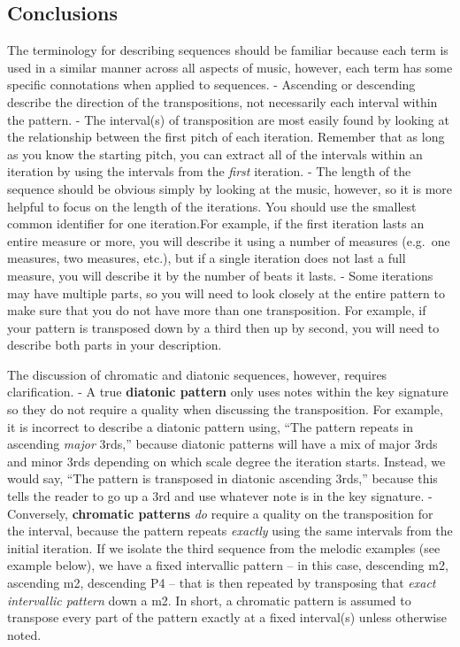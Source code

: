 \documentclass{book}
\begin{document}
\hypertarget{conclusions-20}{%
\subsection{Conclusions}\label{conclusions-20}}

The terminology for describing sequences should be familiar because each term
is used in a similar manner across all aspects of music, however, each term
has some specific connotations when applied to sequences. - Ascending or
descending describe the direction of the transpositions, not necessarily each
interval within the pattern. - The interval(s) of transposition are most
easily found by looking at the relationship between the first pitch of each
iteration. Remember that as long as you know the starting pitch, you can
extract all of the intervals within an iteration by using the intervals from
the \emph{first} iteration. - The length of the sequence should be obvious
simply by looking at the music, however, so it is more helpful to focus on the
length of the iterations. You should use the smallest common identifier for
one iteration.For example, if the first iteration lasts an entire measure or
more, you will describe it using a number of measures (e.g.~one measures, two
measures, etc.), but if a single iteration does not last a full measure, you
will describe it by the number of beats it lasts. - Some iterations may have
multiple parts, so you will need to look closely at the entire pattern to make
sure that you do not have more than one transposition. For example, if your
pattern is transposed down by a third then up by second, you will need to
describe both parts in your description.

The discussion of chromatic and diatonic sequences, however, requires
clarification. - A true \textbf{diatonic pattern} only uses notes within the
key signature so they do not require a quality when discussing the
transposition. For example, it is incorrect to describe a diatonic pattern
using, ``The pattern repeats in ascending \emph{major} 3rds,'' because
diatonic patterns will have a mix of major 3rds and minor 3rds depending on
which scale degree the iteration starts. Instead, we would say, ``The pattern
is transposed in diatonic ascending 3rds,'' because this tells the reader to
go up a 3rd and use whatever note is in the key signature. - Conversely,
\textbf{chromatic patterns} \emph{do} require a quality on the transposition
for the interval, because the pattern repeats \emph{exactly} using the same
intervals from the initial iteration. If we isolate the third sequence from
the melodic examples (see example below), we have a fixed intervallic pattern
-- in this case, descending m2, ascending m2, descending P4 -- that is then
repeated by transposing that \emph{exact intervallic pattern} down a m2. In
short, a chromatic pattern is assumed to transpose every part of the pattern
exactly at a fixed interval(s) unless otherwise noted.
\end{document}
